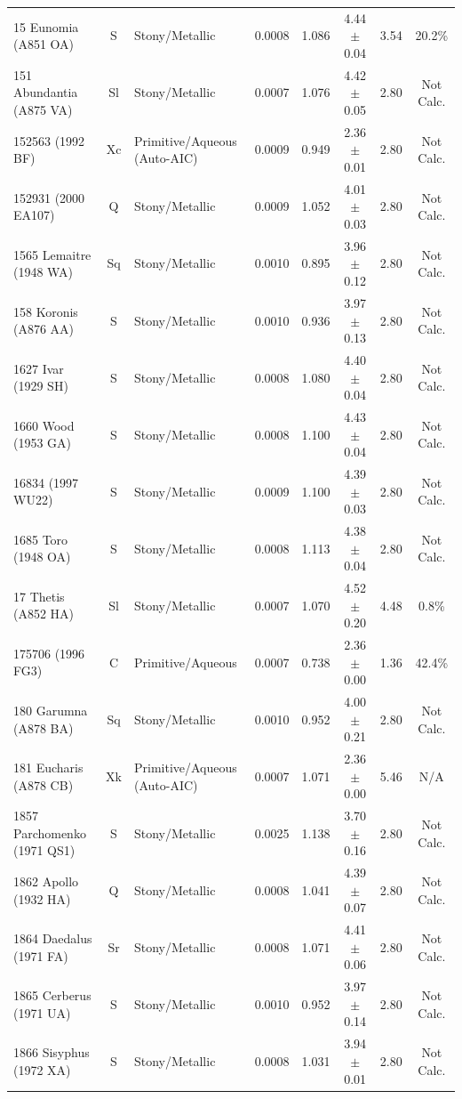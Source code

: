 {\begin{longtable}{p{2.6cm} c p{2.2cm} c c c c c}
15 Eunomia (A851 OA) & S & Stony/Metallic & 0.0008 & 1.086 & 4.44 $\pm$ 0.04 & 3.54 & 20.2\% \\
151 Abundantia (A875 VA) & Sl & Stony/Metallic & 0.0007 & 1.076 & 4.42 $\pm$ 0.05 & 2.80 & Not Calc. \\
152563 (1992 BF) & Xc & Primitive/Aqueous (Auto-AIC) & 0.0009 & 0.949 & 2.36 $\pm$ 0.01 & 2.80 & Not Calc. \\
152931 (2000 EA107) & Q & Stony/Metallic & 0.0009 & 1.052 & 4.01 $\pm$ 0.03 & 2.80 & Not Calc. \\
1565 Lemaitre (1948 WA) & Sq & Stony/Metallic & 0.0010 & 0.895 & 3.96 $\pm$ 0.12 & 2.80 & Not Calc. \\
158 Koronis (A876 AA) & S & Stony/Metallic & 0.0010 & 0.936 & 3.97 $\pm$ 0.13 & 2.80 & Not Calc. \\
1627 Ivar (1929 SH) & S & Stony/Metallic & 0.0008 & 1.080 & 4.40 $\pm$ 0.04 & 2.80 & Not Calc. \\
1660 Wood (1953 GA) & S & Stony/Metallic & 0.0008 & 1.100 & 4.43 $\pm$ 0.04 & 2.80 & Not Calc. \\
16834 (1997 WU22) & S & Stony/Metallic & 0.0009 & 1.100 & 4.39 $\pm$ 0.03 & 2.80 & Not Calc. \\
1685 Toro (1948 OA) & S & Stony/Metallic & 0.0008 & 1.113 & 4.38 $\pm$ 0.04 & 2.80 & Not Calc. \\
17 Thetis (A852 HA) & Sl & Stony/Metallic & 0.0007 & 1.070 & 4.52 $\pm$ 0.20 & 4.48 & 0.8\% \\
175706 (1996 FG3) & C & Primitive/Aqueous & 0.0007 & 0.738 & 2.36 $\pm$ 0.00 & 1.36 & 42.4\% \\
180 Garumna (A878 BA) & Sq & Stony/Metallic & 0.0010 & 0.952 & 4.00 $\pm$ 0.21 & 2.80 & Not Calc. \\
181 Eucharis (A878 CB) & Xk & Primitive/Aqueous (Auto-AIC) & 0.0007 & 1.071 & 2.36 $\pm$ 0.00 & 5.46 & N/A \\
1857 Parchomenko (1971 QS1) & S & Stony/Metallic & 0.0025 & 1.138 & 3.70 $\pm$ 0.16 & 2.80 & Not Calc. \\
1862 Apollo (1932 HA) & Q & Stony/Metallic & 0.0008 & 1.041 & 4.39 $\pm$ 0.07 & 2.80 & Not Calc. \\
1864 Daedalus (1971 FA) & Sr & Stony/Metallic & 0.0008 & 1.071 & 4.41 $\pm$ 0.06 & 2.80 & Not Calc. \\
1865 Cerberus (1971 UA) & S & Stony/Metallic & 0.0010 & 0.952 & 3.97 $\pm$ 0.14 & 2.80 & Not Calc. \\
1866 Sisyphus (1972 XA) & S & Stony/Metallic & 0.0008 & 1.031 & 3.94 $\pm$ 0.01 & 2.80 & Not Calc. \\

\end{longtable}}
